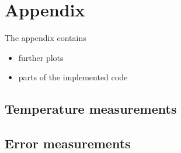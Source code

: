 \chapter{Appendix}
\label{apx:appendix}

The appendix contains 

\begin{itemize}
\item further plots
\item parts of the implemented code
\end{itemize}

\section{Temperature measurements}
\label{apx:Temp_meas}




\newpage


\section{Error measurements}
\label{apx:Error_meas}





{\scriptsize

}
